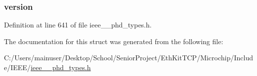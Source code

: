 \subsubsection[{version}]{ version}\label{struct___type_ver_a8f21cc4af3cb68ecce8552a1bd14a8cf}


Definition at line 641 of file ieee\+\_\+\_\+phd\+\_\+types.\+h.



The documentation for this struct was generated from the following file\+:\begin{DoxyCompactItemize}
\item 
C\+:/\+Users/mainuser/\+Desktop/\+School/\+Senior\+Project/\+Eth\+Kit\+T\+C\+P/\+Microchip/\+Include/\+I\+E\+E\+E/\hyperlink{ieee__11073__phd__types_8h}{ieee\+\_\+\_\+phd\+\_\+types.\+h}\end{DoxyCompactItemize}

